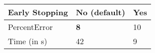 \begin{table}[h!]
\centering
\begin{tabular}{ |p{2cm}||p{1.5cm}|p{0.75cm}|  }
    \hline
    Early Stopping& No (default) & Yes \\
    \hline \hline
    PercentError & \textbf{8} & 10\\
    \hline
    Time (in s) & 42 & 9\\
    \hline
\end{tabular}
\caption{}
\label{early_stopping_performance}
\end{table}